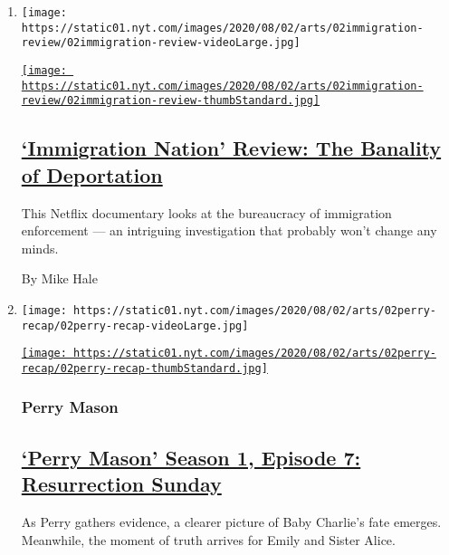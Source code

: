 \begin{enumerate}
\def\labelenumi{\arabic{enumi}.}
\item
  \texttt{[image: https://static01.nyt.com/images/2020/08/02/arts/02immigration-review/02immigration-review-videoLarge.jpg]}

  \href{/2020/08/02/arts/television/immigration-nation-review-netflix.html}{\texttt{[image: https://static01.nyt.com/images/2020/08/02/arts/02immigration-review/02immigration-review-thumbStandard.jpg]}}

  \hypertarget{immigration-nation-review-the-banality-of-deportation}{%
  \subsection{\texorpdfstring{\href{/2020/08/02/arts/television/immigration-nation-review-netflix.html}{`Immigration
  Nation' Review: The Banality of
  Deportation}}{`Immigration Nation' Review: The Banality of Deportation}}\label{immigration-nation-review-the-banality-of-deportation}}

  This Netflix documentary looks at the bureaucracy of immigration
  enforcement --- an intriguing investigation that probably won't change
  any minds.

  By Mike Hale
\item
  \texttt{[image: https://static01.nyt.com/images/2020/08/02/arts/02perry-recap/02perry-recap-videoLarge.jpg]}

  \href{/2020/08/02/arts/television/perry-mason-recap-episode-7.html}{\texttt{[image: https://static01.nyt.com/images/2020/08/02/arts/02perry-recap/02perry-recap-thumbStandard.jpg]}}

  \hypertarget{perry-mason}{%
  \subsubsection{Perry Mason}\label{perry-mason}}

  \hypertarget{perry-mason-season-1-episode-7-resurrection-sunday}{%
  \subsection{\texorpdfstring{\href{/2020/08/02/arts/television/perry-mason-recap-episode-7.html}{`Perry
  Mason' Season 1, Episode 7: Resurrection
  Sunday}}{`Perry Mason' Season 1, Episode 7: Resurrection Sunday}}\label{perry-mason-season-1-episode-7-resurrection-sunday}}

  As Perry gathers evidence, a clearer picture of Baby Charlie's fate
  emerges. Meanwhile, the moment of truth arrives for Emily and Sister
  Alice.


\end{enumerate}
